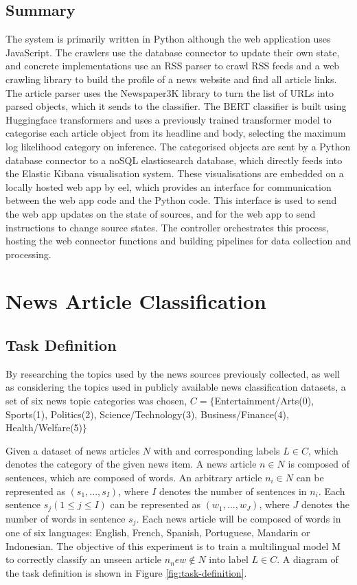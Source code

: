 \documentclass{l4proj}
\begin{document}
\section{Summary}
The system is primarily written in Python although the web application uses JavaScript. The crawlers use the database connector to update their own state, and concrete implementations use an RSS parser to crawl RSS feeds and a web crawling library to build the profile of a news website and find all article links. The article parser uses the Newspaper3K library to turn the list of URLs into parsed objects, which it sends to the classifier. The BERT classifier is built using Huggingface transformers and uses a previously trained transformer model to categorise each article object from its headline and body, selecting the maximum log likelihood category on inference. The categorised objects are sent by a Python database connector to a noSQL elasticsearch database, which directly feeds into the Elastic Kibana visualisation system. These visualisations are embedded on a locally hosted web app by eel, which provides an interface for communication between the web app code and the Python code. This interface is used to send the web app updates on the state of sources, and for the web app to send instructions to change source states. The controller orchestrates this process, hosting the web connector functions and building pipelines for data collection and processing.




\chapter{News Article Classification}

\section{Task Definition}
By researching the topics used by the news sources previously collected, as well as considering the topics used in publicly available news classification datasets, a set of six news topic categories was chosen, $C = \{$Entertainment/Arts(0), Sports(1), Politics(2), Science/Technology(3), Business/Finance(4), Health/Welfare(5)$\}$ \par
Given a dataset of news articles $N$ with and corresponding labels $L\in C$, which denotes the category of the given news item. A news article $n \in N$ is composed of sentences, which are composed of words. An arbitrary article $n_i \in N$ can be represented as $(s_1,...,s_I)$, where $I$ denotes the number of sentences in $n_i$. Each sentence $s_j (1 \leq j \leq I)$ can be represented as $(w_1,...,w_J)$, where $J$ denotes the number of words in sentence $s_j$. Each news article will be composed of words in one of six languages: English, French, Spanish, Portuguese, Mandarin or Indonesian. The objective of this experiment is to train a multilingual model M to correctly classify an unseen article $n_new \notin N$ into label $L\in C$. A diagram of the task definition is shown in Figure \ref{fig:task-definition}.
\end{document}
